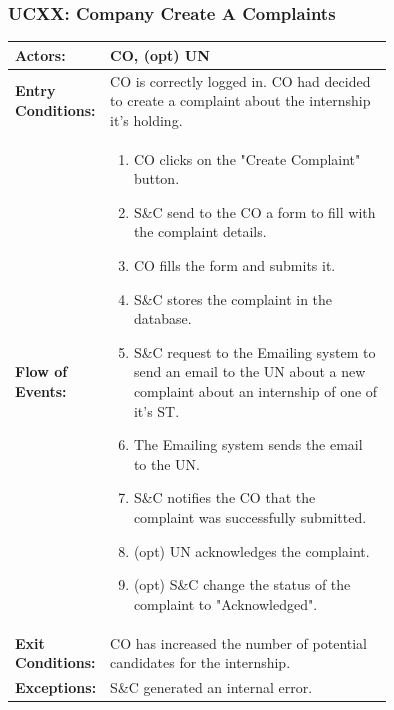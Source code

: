 \subsubsection{UCXX: Company Create A Complaints}
\label{subsubsec:company-create-a-complaints}

\begin{center}
    \begin{longtable}{|l|p{0.75\linewidth}|}
        \hline
        \textbf{Actors:}           & CO, (opt) UN                                                                                                      \\
        \hline
        \textbf{Entry Conditions:} &  CO is correctly logged in. CO had decided to create a complaint about the internship it's holding.                \\
        \hline
        \textbf{Flow of Events:}   & \begin{enumerate}
            \item CO clicks on the "Create Complaint" button.
            \item S\&C send to the CO a form to fill with the complaint details.
            \item CO fills the form and submits it.
            \item S\&C stores the complaint in the database.
            \item S\&C request to the Emailing system to send an email to the UN about a new complaint about an internship of one of it's ST.
            \item The Emailing system sends the email to the UN.
            \item S\&C notifies the CO that the complaint was successfully submitted.
            \item (opt) UN acknowledges the complaint.
            \item (opt) S\&C change the status of the complaint to "Acknowledged".                             
                                     \end{enumerate} \\
        \hline
        \textbf{Exit Conditions:}  & CO has increased the number of potential candidates for the internship.                                               \\
        \hline
        \textbf{Exceptions:}       & S\&C generated an internal error.                                                                                     \\
        \hline
    \end{longtable}
\end{center}

